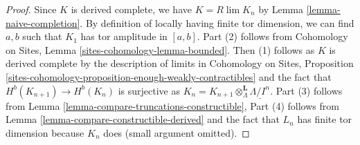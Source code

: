 \documentclass[10pt,a4paper]{amsart}
\theoremstyle{plain}
\theoremstyle{definition}
\theoremstyle{remark}
\numberwithin{equation}{subsection}
\def\lim{\mathop{\mathrm{lim}}\nolimits}
\begin{document}
\begin{proof}
Since $K$ is derived complete, we have $K = R\lim K_n$ by
Lemma \ref{lemma-naive-completion}.
By definition of locally having finite tor dimension, we can find
$a, b$ such that $K_1$ has tor amplitude in $[a, b]$.
Part (2) follows from 
Cohomology on Sites, Lemma \ref{sites-cohomology-lemma-bounded}.
Then (1) follows as $K$ is derived complete by the description
of limits in
Cohomology on Sites, Proposition
\ref{sites-cohomology-proposition-enough-weakly-contractibles}
and the fact that $H^b(K_{n + 1}) \to H^b(K_n)$ is surjective
as $K_n = K_{n + 1} \otimes^\mathbf{L}_\Lambda \underline{\Lambda/I^n}$.
Part (3) follows from
Lemma \ref{lemma-compare-truncations-constructible},
Part (4) follows from
Lemma \ref{lemma-compare-constructible-derived}
and the fact that $L_n$ has finite tor dimension because $K_n$ does
(small argument omitted).
\end{proof}
\end{document}
